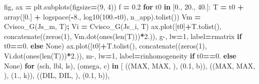 \documentclass[
  a4paper,
  numbers=noendperiod,
  DIV=12]{scrreprt}
\newenvironment{Shaded}{\begin{snugshade}}{\end{snugshade}}
\newcommand{\BuiltInTok}[1]{#1}
\newcommand{\ControlFlowTok}[1]{\textcolor[rgb]{0.13,0.29,0.53}{\textbf{#1}}}
\newcommand{\DecValTok}[1]{\textcolor[rgb]{0.00,0.00,0.81}{#1}}
\newcommand{\FloatTok}[1]{\textcolor[rgb]{0.00,0.00,0.81}{#1}}
\newcommand{\KeywordTok}[1]{\textcolor[rgb]{0.13,0.29,0.53}{\textbf{#1}}}
\newcommand{\NormalTok}[1]{#1}
\newcommand{\OperatorTok}[1]{\textcolor[rgb]{0.81,0.36,0.00}{\textbf{#1}}}
\newcommand{\StringTok}[1]{\textcolor[rgb]{0.31,0.60,0.02}{#1}}
\newcommand{\VariableTok}[1]{\textcolor[rgb]{0.00,0.00,0.00}{#1}}
\newcommand{\VerbatimStringTok}[1]{\textcolor[rgb]{0.31,0.60,0.02}{#1}}
\begin{document}
\begin{Shaded}
\begin{Highlighting}[]
\NormalTok{fig, ax }\OperatorTok{=}\NormalTok{ plt.subplots(figsize}\OperatorTok{=}\NormalTok{(}\DecValTok{9}\NormalTok{, }\DecValTok{4}\NormalTok{))}
\NormalTok{f }\OperatorTok{=} \FloatTok{0.2}
\ControlFlowTok{for}\NormalTok{ t0 }\KeywordTok{in}\NormalTok{ [}\FloatTok{0.}\NormalTok{, }\FloatTok{20.}\NormalTok{, }\FloatTok{40.}\NormalTok{]:}
\NormalTok{    T }\OperatorTok{=}\NormalTok{ t0 }\OperatorTok{+}\NormalTok{ array([}\FloatTok{0.}\NormalTok{] }\OperatorTok{+}\NormalTok{ logspace(}\OperatorTok{{-}}\FloatTok{8.}\NormalTok{, log10(}\FloatTok{100.}\OperatorTok{{-}}\NormalTok{t0), n\_app).tolist())}
\NormalTok{    Vm }\OperatorTok{=}\NormalTok{ Cvisco\_G(Js\_m, T)}\OperatorTok{;}\NormalTok{  Vi }\OperatorTok{=}\NormalTok{ Cvisco\_G(Js\_i, T)}
\NormalTok{    ax.plot([t0]}\OperatorTok{+}\NormalTok{T.tolist(), concatenate((zeros(}\DecValTok{1}\NormalTok{), Vm.dot(ones(}\BuiltInTok{len}\NormalTok{(T)))}\OperatorTok{*}\FloatTok{2.}\NormalTok{)),}
            \StringTok{\textquotesingle{}g{-}\textquotesingle{}}\NormalTok{, lw}\OperatorTok{=}\DecValTok{1}\NormalTok{, label}\OperatorTok{=}\VerbatimStringTok{r\textquotesingle{}matrix\textquotesingle{}} \ControlFlowTok{if}\NormalTok{ t0}\OperatorTok{==}\FloatTok{0.} \ControlFlowTok{else} \VariableTok{None}\NormalTok{)}
\NormalTok{    ax.plot([t0]}\OperatorTok{+}\NormalTok{T.tolist(), concatenate((zeros(}\DecValTok{1}\NormalTok{), Vi.dot(ones(}\BuiltInTok{len}\NormalTok{(T)))}\OperatorTok{*}\FloatTok{2.}\NormalTok{)),}
            \StringTok{\textquotesingle{}m{-}\textquotesingle{}}\NormalTok{, lw}\OperatorTok{=}\DecValTok{1}\NormalTok{, label}\OperatorTok{=}\VerbatimStringTok{r\textquotesingle{}inhomogeneity\textquotesingle{}} \ControlFlowTok{if}\NormalTok{ t0}\OperatorTok{==}\FloatTok{0.} \ControlFlowTok{else} \VariableTok{None}\NormalTok{)}
    \ControlFlowTok{for}\NormalTok{ (sch, lbl, ls), (omega, c) }\KeywordTok{in}\NormalTok{ [}
\NormalTok{            ((MAX, }\StringTok{\textquotesingle{}MAX\textquotesingle{}}\NormalTok{, }\StringTok{\textquotesingle{}{-}\textquotesingle{}}\NormalTok{),  (}\FloatTok{0.1}\NormalTok{, }\StringTok{\textquotesingle{}b\textquotesingle{}}\NormalTok{)),}
\NormalTok{            ((MAX, }\StringTok{\textquotesingle{}MAX\textquotesingle{}}\NormalTok{, }\StringTok{\textquotesingle{}{-}\textquotesingle{}}\NormalTok{),  (}\FloatTok{1.}\NormalTok{,  }\StringTok{\textquotesingle{}k\textquotesingle{}}\NormalTok{)),}
\NormalTok{            ((DIL, }\StringTok{\textquotesingle{}DIL\textquotesingle{}}\NormalTok{, }\StringTok{\textquotesingle{}{-}{-}\textquotesingle{}}\NormalTok{), (}\FloatTok{0.1}\NormalTok{, }\StringTok{\textquotesingle{}b\textquotesingle{}}\NormalTok{)),}

\end{Highlighting}
\end{Shaded}
\end{document}
